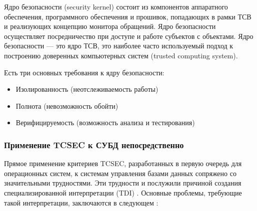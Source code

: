 Ядро безопасности (security kernel) состоит из компонентов аппаратного обеспечения, программного обеспечения и прошивок, попадающих в рамки ТСВ и реализующих концепцию монитора обращений.
Ядро безопасности осуществляет посредничество при доступе и работе субъектов с объектами. Ядро безопасности --- это ядро ТСВ, это наиболее часто используемый подход к построению доверенных компьютерных систем (trusted computing system). \cite{CISSP}

Есть три основных требования к ядру безопасности:
\begin{itemize}
	\item Изолированность (неотслеживаемость работы)
	\item Полнота (невозможность обойти)
	\item Верифицируемость (возможность анализа и тестирования)
\end{itemize}

\subsubsection{Применение TCSEC к СУБД непосредственно}
Прямое применение критериев TCSEC, разработанных в первую очередь для операционных систем, к системам управления базами данных сопряжено со значительными трудностями. Эти трудности и послужили причиной создания специализированной интерпретации (TDI) \cite{PurpleBook}. Основные проблемы, требующие такой интерпретации, заключаются в следующем \cite[Introduction, Section 1]{PurpleBook}:


